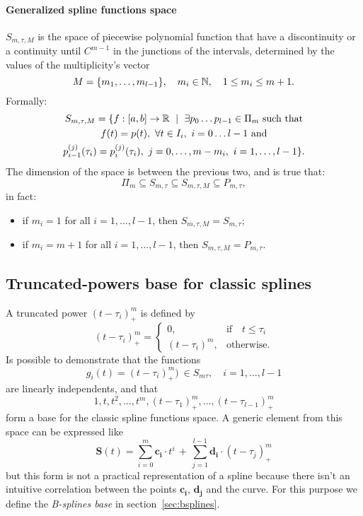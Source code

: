 \documentclass[dissertation.tex]{subfiles}
\begin{document}
\paragraph{Generalized spline functions space} $S_{m,\tau,M}$ is the
space of piecewise polynomial function that have a discontinuity or a
continuity until $C^{m-1}$ in the junctions of the intervals,
determined by the values of the multiplicity's
vector
$$
M=\{m_1,\dots,m_{l-1}\},\quad m_i\in\mathbb{N},\quad 1\leq m_i\leq m+1.
$$
Formally:
\begin{multline*}
  S_{m,\tau,M}=\{f:[a,b]\rightarrow\mR\ \mid\ \exists p_0\dots
  p_{l-1}\in\Pi_m \ \text{such that}\\
  f(t)=p(t),\ \forall t\in I_i,\
  i=0\dots l-1\ \text{and}\\
  p_{i-1}^{(j)}(\tau_i)=p_{i}^{(j)}(\tau_i),\ j=0,\dots,m-m_i,\ i=1,\dots,l-1\}.
\end{multline*}
The dimension of the space is between the previous two, and is true
that:
$$
\Pi_m\subseteq S_{m,\tau}\subseteq S_{m,\tau,M}\subseteq P_{m,\tau},
$$
in fact:
\begin{itemize}
  \item if $m_i=1$ for all $i=1,\dots,l-1$, then
    $S_{m,\tau,M}=S_{m,\tau}$;
  \item if $m_i=m+1$ for all $i=1,\dots,l-1$, then
    $S_{m,\tau,M}=P_{m,\tau}$.
\end{itemize}

\subsection{Truncated-powers base for classic splines}\label{sec:truncpow}
A truncated power $(t-\tau_i)_+^m$ is
defined by
$$
(t-\tau_i)_+^m=
\begin{cases}
  0,&\mbox{if}\quad t\leq\tau_i\\
  (t-\tau_i)^m, &\mbox{otherwise}.
\end{cases}
$$
Is possible to demonstrate that the functions
$$
g_i(t)=(t-\tau_i)_+^m)\ \in S_{m\tau},\quad i=1,\dots,l-1
$$
are linearly independents, and that
$$
1,t,t^2,\dots,t^m,(t-\tau_1)_+^m,\dots,(t-\tau_{l-1})_+^m
$$
form a base for the classic spline functions space. A generic element
from this space can be expressed like
$$
\mathbf{S}(t)=\sum_{i=0}^m \mathbf{c_i}\cdot t^i\, +\, \sum_{j=1}^{l-1} \mathbf{d_i}\cdot (t-\tau_j)_+^m
$$
but this form is not a practical representation of a spline because
there isn't an intuitive correlation between the points
$\mathbf{c_i}$, $\mathbf{d_j}$ and the curve. For this purpose we
define the \emph{B-splines base} in section~\ref{sec:bsplines}.
\end{document}
